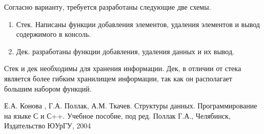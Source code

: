 \documentclass[12pt, a4paper]{article}
\begin{document}
Согласно варианту, требуется разработаны следующие две схемы.
\begin{enumerate}
\item Стек. Написаны функции добавления элементов, удаления элементов и вывод содержимого в консоль.
\item Дек. разработаны функции добавления, удаления данных и их вывод.
\end{enumerate}

Стек и дек необходимы для хранения информации. Дек, в отличии от стека является более гибким хранилищем информации, так как он располагает большим набором функций. 

\newpage
\begin{center}
\begin{thebibliography}{}
 Е.А. Конова , Г.А. Поллак, А.М. Ткачев. Структуры данных. Программирование на языке С и С++. Учебное пособие, под ред. Поллак Г.А., Челябинск, Издательство ЮУрГУ, 2004 
\end{thebibliography}
\end{center}
\end{document}
